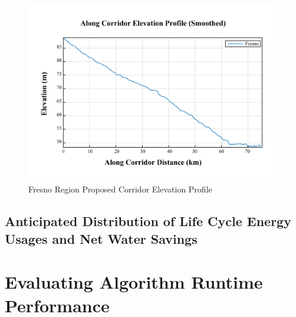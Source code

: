         \begin{figure}[!h]
            \begin{center}
            \includegraphics[width=5.5in]{figures/Fresno_Elevation_Profile.png}   
            \caption{Fresno Region Proposed Corridor Elevation Profile}
            \label{fig:FelevationProfile}
            \end{center}
        \end{figure}
        
    \subsection{Anticipated Distribution of Life Cycle Energy Usages and Net Water Savings}

\clearpage
    
\section{Evaluating Algorithm Runtime Performance}

